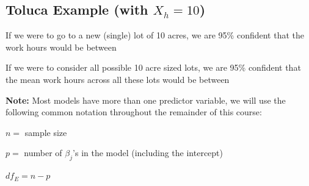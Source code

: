 \documentclass[12pt]{notes}
\begin{document}

\begin{minipage}[l][2cm][c]{\textwidth}

\end{minipage}

\subsection*{Toluca Example (with $X_h = 10$)}
\bi
\item If we were to go to a new (single) lot of 10 acres, we are 95\% confident that the work hours would be between 
 
 \begin{minipage}[l][2cm][c]{\textwidth}

\end{minipage}

\item If we were to consider all possible 10 acre sized lots, we are 95\% confident that the mean work hours across all these lots would be between  

 \begin{minipage}[l][2cm][c]{\textwidth}

\end{minipage}
\ei

\textbf{Note:} Most models have more than one predictor variable, we will use the following common notation throughout the remainder of this course:
\bi
\item $n =$ sample size
\item $p =$ number of $\beta_j$'s in the model (including the intercept)
\item $df_E = n-p$
\ei
















\end{document}
